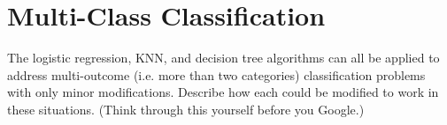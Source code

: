 \chapter{Multi-Class Classification}

\begin{question}{}
The logistic regression, KNN, and decision tree algorithms can all be applied to address multi-outcome (i.e. more than two categories) classification problems with only minor modifications. Describe how each could be modified to work in these situations. (Think through this yourself before you Google.)
\end{question}